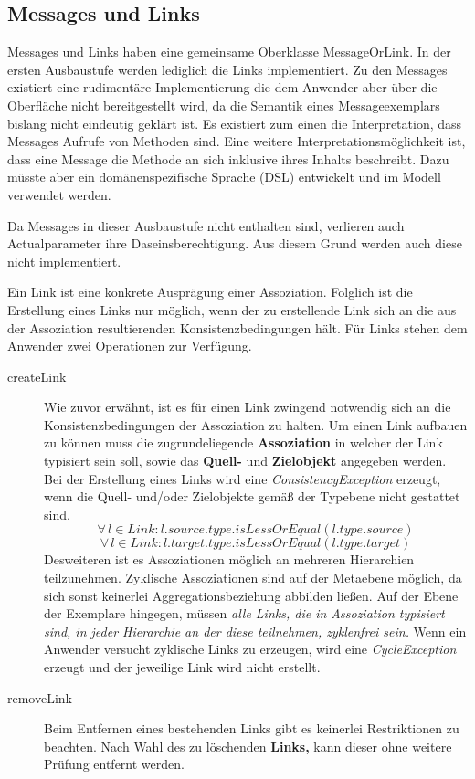 \subsection{Messages und Links}\label{Message:Message}

Messages und Links haben eine gemeinsame Oberklasse MessageOrLink. In der ersten Ausbaustufe werden lediglich die Links implementiert. Zu den Messages existiert eine rudimentäre
Implementierung die dem Anwender aber über die Oberfläche nicht bereitgestellt wird, da die 
Semantik eines Messageexemplars bislang nicht eindeutig geklärt ist.
Es existiert zum einen die Interpretation, dass Messages Aufrufe von Methoden sind. Eine weitere Interpretationsmöglichkeit ist, dass eine Message die Methode an sich inklusive ihres Inhalts beschreibt. 
Dazu müsste aber ein domänenspezifische Sprache (DSL) entwickelt und im Modell verwendet werden.

Da Messages in dieser Ausbaustufe nicht enthalten sind, verlieren auch Actualparameter ihre Daseinsberechtigung. Aus diesem Grund werden auch diese nicht implementiert.

Ein Link ist eine konkrete Ausprägung einer Assoziation. Folglich ist die Erstellung eines Links nur möglich, wenn der zu erstellende Link sich an die aus der Assoziation resultierenden Konsistenzbedingungen hält. Für Links stehen dem Anwender zwei Operationen zur Verfügung.

\begin{description}
\item[createLink]
Wie zuvor erwähnt, ist es für einen Link zwingend notwendig sich an die Konsistenzbedingungen der Assoziation zu halten. Um einen Link aufbauen zu können muss die zugrundeliegende  \textbf{Assoziation} in welcher der Link typisiert sein soll, sowie das \textbf{Quell-} und \textbf{Zielobjekt} angegeben werden.
Bei der Erstellung eines Links wird eine \emph{ConsistencyException} erzeugt, wenn die Quell- und/oder Zielobjekte gemäß der Typebene nicht 
gestattet sind.
\begin{equation} \forall \, l \in Link: l.source.type.isLessOrEqual(l.type.source)
\end{equation} 
\begin{equation} \forall \, l \in Link: l.target.type.isLessOrEqual(l.type.target)
\end{equation}
Desweiteren ist es Assoziationen möglich an mehreren Hierarchien teilzunehmen. Zyklische Assoziationen sind auf der Metaebene möglich, 
da sich sonst keinerlei Aggregationsbeziehung abbilden ließen.
Auf der Ebene der Exemplare hingegen, müssen \emph{alle Links, die in Assoziation typisiert sind, in jeder Hierarchie an der diese teilnehmen, zyklenfrei sein.}
Wenn ein Anwender versucht zyklische Links zu erzeugen, wird eine \emph{CycleException} erzeugt und der jeweilige Link wird nicht erstellt.
\item[removeLink]
Beim Entfernen eines bestehenden Links gibt es keinerlei Restriktionen zu beachten. Nach Wahl des zu löschenden \textbf{Links,} kann dieser ohne weitere Prüfung entfernt werden.
\end{description}